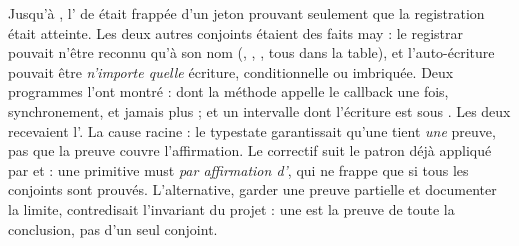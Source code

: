 \begin{decision}
Jusqu'à , l'\Error{} de  était frappée d'un jeton  prouvant seulement que la registration était atteinte. Les deux autres conjoints étaient des faits may : le registrar pouvait n'être reconnu qu'à son nom (, , , tous  dans la table), et l'auto-écriture pouvait être \emph{n'importe quelle} écriture, conditionnelle ou imbriquée. Deux programmes l'ont montré :  dont la méthode  appelle le callback une fois, synchronement, et jamais plus ; et un intervalle dont l'écriture est sous . Les deux recevaient l'\Error. La cause racine : le typestate garantissait qu'une \Error{} tient \emph{une} preuve, pas que la preuve couvre l'affirmation. Le correctif suit le patron déjà appliqué par  et  : une primitive must \emph{par affirmation d'\Error}, qui ne frappe que si tous les conjoints sont prouvés. L'alternative, garder une preuve partielle et documenter la limite, contredisait l'invariant du projet : une \Error{} est la preuve de toute la conclusion, pas d'un seul conjoint.
\end{decision}

